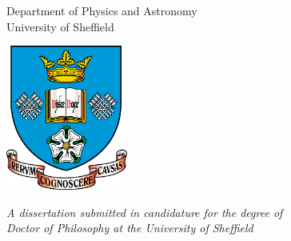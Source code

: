 \vspace*{1cm}

\begin{center}
    \begin{Huge}
        \textbf{\text{\thetitle}}
    \end{Huge}

    \vspace*{2.5cm}

    \begin{LARGE}
        \text{\theauthor}
    \end{LARGE}

    \vspace*{2cm}

    \begin{Large}
        Department of Physics and Astronomy \\
        University of Sheffield
    \end{Large}

    \vspace*{2cm}

    \includegraphics[width=0.3\textwidth]{./images/University_of_Sheffield_coat_of_arms.png}

    \vspace*{1cm}

    \begin{large}
        \textit{A dissertation submitted in candidature for the degree of} \\
        \textit{Doctor of Philosophy at the University of Sheffield}
    \end{large}

    \vspace*{1.5cm}

    \begin{large}
        \text{\thedate}
    \end{large}

    \vfill
\end{center}

